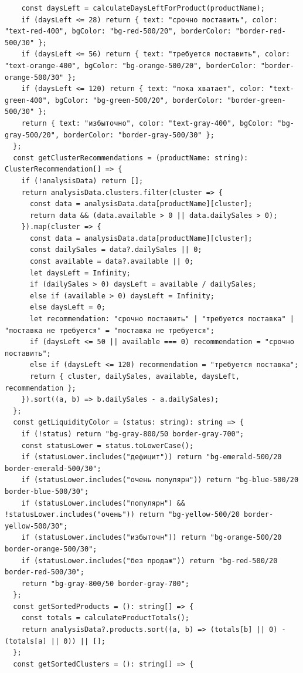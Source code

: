 \begin{code}
\begin{verbatim}
    const daysLeft = calculateDaysLeftForProduct(productName);
    if (daysLeft <= 28) return { text: "срочно поставить", color: "text-red-400", bgColor: "bg-red-500/20", borderColor: "border-red-500/30" };
    if (daysLeft <= 56) return { text: "требуется поставить", color: "text-orange-400", bgColor: "bg-orange-500/20", borderColor: "border-orange-500/30" };
    if (daysLeft <= 120) return { text: "пока хватает", color: "text-green-400", bgColor: "bg-green-500/20", borderColor: "border-green-500/30" };
    return { text: "избыточно", color: "text-gray-400", bgColor: "bg-gray-500/20", borderColor: "border-gray-500/30" };
  };
  const getClusterRecommendations = (productName: string): ClusterRecommendation[] => {
    if (!analysisData) return [];
    return analysisData.clusters.filter(cluster => {
      const data = analysisData.data[productName][cluster];
      return data && (data.available > 0 || data.dailySales > 0);
    }).map(cluster => {
      const data = analysisData.data[productName][cluster];
      const dailySales = data?.dailySales || 0;
      const available = data?.available || 0;
      let daysLeft = Infinity;
      if (dailySales > 0) daysLeft = available / dailySales;
      else if (available > 0) daysLeft = Infinity;
      else daysLeft = 0;
      let recommendation: "срочно поставить" | "требуется поставка" | "поставка не требуется" = "поставка не требуется";
      if (daysLeft <= 50 || available === 0) recommendation = "срочно поставить";
      else if (daysLeft <= 120) recommendation = "требуется поставка";
      return { cluster, dailySales, available, daysLeft, recommendation };
    }).sort((a, b) => b.dailySales - a.dailySales);
  };
  const getLiquidityColor = (status: string): string => {
    if (!status) return "bg-gray-800/50 border-gray-700";
    const statusLower = status.toLowerCase();
    if (statusLower.includes("дефицит")) return "bg-emerald-500/20 border-emerald-500/30";
    if (statusLower.includes("очень популярн")) return "bg-blue-500/20 border-blue-500/30";
    if (statusLower.includes("популярн") && !statusLower.includes("очень")) return "bg-yellow-500/20 border-yellow-500/30";
    if (statusLower.includes("избыточн")) return "bg-orange-500/20 border-orange-500/30";
    if (statusLower.includes("без продаж")) return "bg-red-500/20 border-red-500/30";
    return "bg-gray-800/50 border-gray-700";
  };
  const getSortedProducts = (): string[] => {
    const totals = calculateProductTotals();
    return analysisData?.products.sort((a, b) => (totals[b] || 0) - (totals[a] || 0)) || [];
  };
  const getSortedClusters = (): string[] => {

\end{verbatim}
\end{code}
